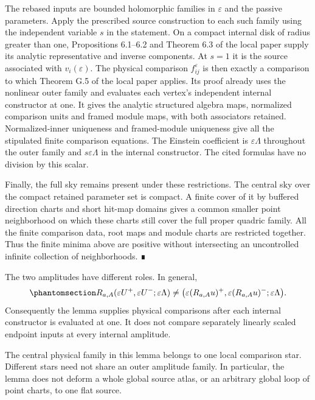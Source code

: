 \documentclass[
  english,
  11pt,
  reqno]{amsart}
\begin{document}
The rebased inputs are bounded holomorphic families in \(\varepsilon\)
and the passive parameters. Apply the prescribed source construction to
each such family using the independent variable \(s\) in the statement.
On a compact internal disk of radius greater than one, Propositions
6.1--6.2 and Theorem 6.3 of the local paper supply its analytic
representative and inverse components. At \(s=1\) it is the source
associated with \(v_i(\varepsilon)\). The physical comparison
\(f_{ij}^\varepsilon\) is then exactly a comparison to which Theorem G.5
of the local paper applies. Its proof already uses the nonlinear outer
family and evaluates each vertex's independent internal constructor at
one. It gives the analytic structured algebra maps, normalized
comparison units and framed module maps, with both associators retained.
Normalized-inner uniqueness and framed-module uniqueness give all the
stipulated finite comparison equations. The Einstein coefficient is
\(\varepsilon\Lambda\) throughout the outer family and
\(s\varepsilon\Lambda\) in the internal constructor. The cited formulas
have no division by this scalar.

Finally, the full sky remains present under these restrictions. The
central sky over the compact retained parameter set is compact. A finite
cover of it by buffered direction charts and short hit-map domains gives
a common smaller point neighborhood on which these charts still cover
the full proper quadric family. All the finite comparison data, root
maps and module charts are restricted together. Thus the finite minima
above are positive without intersecting an uncontrolled infinite
collection of neighborhoods. ∎

The two amplitudes have different roles. In general,
\begin{equation}\protect\phantomsection\label{eq:source-amplitude-rebase-noncommutation}{
R_{a,A}(\varepsilon U^+,\varepsilon U^-;\varepsilon\Lambda)
\ne
\bigl(\varepsilon(R_{a,A}u)^+,
      \varepsilon(R_{a,A}u)^-;\varepsilon\Lambda\bigr).
}\end{equation} Consequently the lemma supplies physical comparisons
after each internal constructor is evaluated at one. It does not compare
separately linearly scaled endpoint inputs at every internal amplitude.

The central physical family in this lemma belongs to one local
comparison star. Different stars need not share an outer amplitude
family. In particular, the lemma does not deform a whole global source
atlas, or an arbitrary global loop of point charts, to one flat source.
\end{document}
